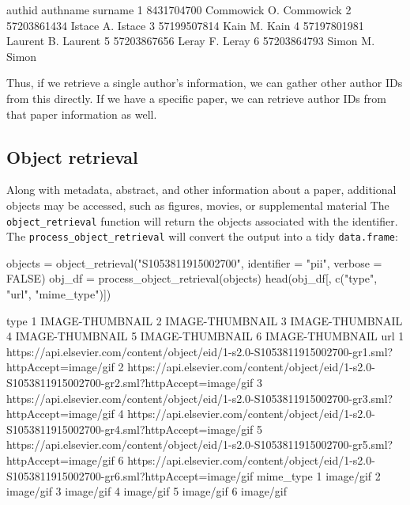 \begin{Schunk}
\begin{Soutput}
       authid     authname   surname
1  8431704700 Commowick O. Commowick
2 57203861434    Istace A.    Istace
3 57199507814      Kain M.      Kain
4 57197801981   Laurent B.   Laurent
5 57203867656     Leray F.     Leray
6 57203864793     Simon M.     Simon
\end{Soutput}
\end{Schunk}

Thus, if we retrieve a single author's information, we can gather other
author IDs from this directly. If we have a specific paper, we can
retrieve author IDs from that paper information as well.

\hypertarget{object-retrieval}{%
\subsection{Object retrieval}\label{object-retrieval}}

Along with metadata, abstract, and other information about a paper,
additional objects may be accessed, such as figures, movies, or
supplemental material The \texttt{object\_retrieval} function will
return the objects associated with the identifier. The
\texttt{process\_object\_retrieval} will convert the output into a tidy
\texttt{data.frame}:

\begin{Schunk}
\begin{Sinput}
objects = object_retrieval("S1053811915002700", identifier = "pii", verbose = FALSE)
obj_df = process_object_retrieval(objects)
head(obj_df[, c("type", "url", "mime_type")])
\end{Sinput}
\begin{Soutput}
             type
1 IMAGE-THUMBNAIL
2 IMAGE-THUMBNAIL
3 IMAGE-THUMBNAIL
4 IMAGE-THUMBNAIL
5 IMAGE-THUMBNAIL
6 IMAGE-THUMBNAIL
                                                                                                url
1 https://api.elsevier.com/content/object/eid/1-s2.0-S1053811915002700-gr1.sml?httpAccept=image/gif
2 https://api.elsevier.com/content/object/eid/1-s2.0-S1053811915002700-gr2.sml?httpAccept=image/gif
3 https://api.elsevier.com/content/object/eid/1-s2.0-S1053811915002700-gr3.sml?httpAccept=image/gif
4 https://api.elsevier.com/content/object/eid/1-s2.0-S1053811915002700-gr4.sml?httpAccept=image/gif
5 https://api.elsevier.com/content/object/eid/1-s2.0-S1053811915002700-gr5.sml?httpAccept=image/gif
6 https://api.elsevier.com/content/object/eid/1-s2.0-S1053811915002700-gr6.sml?httpAccept=image/gif
  mime_type
1 image/gif
2 image/gif
3 image/gif
4 image/gif
5 image/gif
6 image/gif
\end{Soutput}
\end{Schunk}

